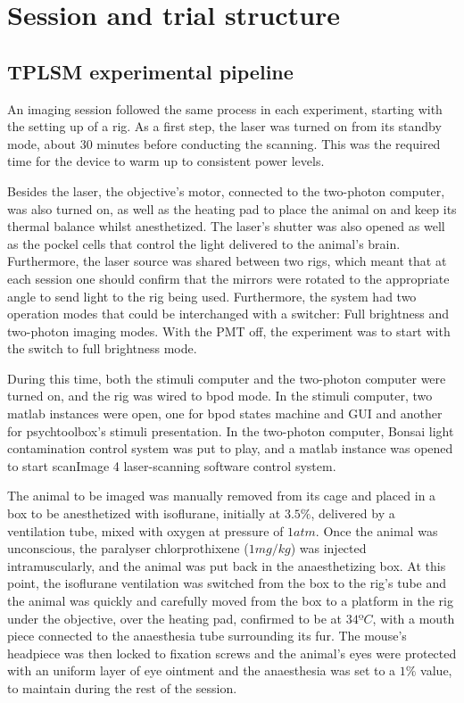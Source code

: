 \section{Session and trial structure}
\label{sec:Session-and-trial-structure}

\subsection{TPLSM experimental pipeline}

An imaging session followed the same process in each experiment, starting with the setting up of a rig.
As a first step, the laser was turned on from its standby mode, about 30 minutes before conducting the scanning. This was the required time for the device to warm up to consistent power levels.

Besides the laser, the objective's motor, connected to the two-photon computer, was also turned on, as well as the heating pad to place the animal on and keep its thermal balance whilst anesthetized. The laser's shutter was also opened as well as the pockel cells that control the light delivered to the animal's brain. Furthermore, the laser source was shared between two rigs, which meant that at each session one should confirm that the mirrors were rotated to the appropriate angle to send light to the rig being used. Furthermore, the system had two operation modes that could be interchanged with a switcher: Full brightness and two-photon imaging modes. With the PMT off, the experiment was to start with the switch to full brightness mode.

During this time, both the stimuli computer and the two-photon computer were turned on, and the rig was wired to bpod mode. In the stimuli computer, two matlab instances were open, one for bpod states machine and GUI and another for psychtoolbox's stimuli presentation. In the two-photon computer, Bonsai light contamination control system was put to play, and a matlab instance was opened to start scanImage 4 laser-scanning software control system.

The animal to be imaged was manually removed from its cage and placed in a box to be anesthetized with isoflurane, initially at $3.5\%$, delivered by a ventilation tube, mixed with oxygen at pressure of $1 atm$. Once the animal was unconscious, the paralyser chlorprothixene ($1 mg/kg$) was injected intramuscularly, and the animal was put back in the anaesthetizing box. At this point, the isoflurane ventilation was switched from the box to the rig's tube and the animal was quickly and carefully moved from the box to a platform in the rig under the objective, over the heating pad, confirmed to be at $34ºC$, with a mouth piece connected to the anaesthesia tube surrounding its fur. The mouse's headpiece was then locked to fixation screws and the animal's eyes were protected with an uniform layer of eye ointment and the anaesthesia was set to a $1\%$ value, to maintain during the rest of the session.

